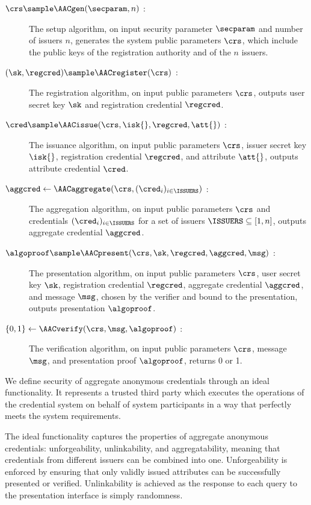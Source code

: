 \begin{description}

  \item[$\crs \sample \AACgen(\secparam, n)$ :] The setup algorithm, on input
security parameter $\secparam$ and number of issuers $n$, generates the system
public parameters $\crs$, which include the public keys of the registration
authority and of the $n$ issuers.

  \item[$(\sk,\regcred) \sample \AACregister(\crs)$ :] The registration
algorithm, on input public parameters $\crs$, outputs user secret key $\sk$ and
registration credential $\regcred$.

  \item[$\cred \sample \AACissue(\crs,\isk{},\regcred,\att{})$ :] The issuance
algorithm, on input public parameters $\crs$, issuer secret key $\isk{}$,
registration credential $\regcred$, and attribute $\att{}$, outputs attribute
credential $\cred$.

  \item[$\aggcred \leftarrow \AACaggregate(\crs,(\cred_i)_{i \in \ISSUERS})$ :]
The aggregation algorithm, on input public parameters $\crs$ and credentials
$(\cred_i)_{i \in \ISSUERS}$ for a set of issuers $\ISSUERS \subseteq [1,n]$,
outputs aggregate credential $\aggcred$.

  \item[$\algoproof \sample \AACpresent(\crs,\sk,\regcred,\aggcred,\msg)$ :]
The presentation algorithm, on input public parameters $\crs$, user secret key
$\sk$, registration credential $\regcred$, aggregate credential $\aggcred$, and
message $\msg$, chosen by the verifier and bound to the presentation, outputs
presentation $\algoproof$.

  \item[$\{0,1\} \leftarrow \AACverify(\crs,\msg,\algoproof)$ :] The
verification algorithm, on input public parameters $\crs$, message $\msg$, and
presentation proof $\algoproof$, returns 0 or 1.

\end{description}

We define security of aggregate anonymous credentials through an ideal
functionality. It represents a
trusted third party which executes the operations of the credential system on
behalf of system participants in a way that perfectly meets the system
requirements.

The ideal functionality captures the properties of aggregate anonymous
credentials: unforgeability, unlinkability, and aggregatability, meaning that
credentials from different issuers can be combined into one.  Unforgeability
is enforced by ensuring that only validly issued attributes can be successfully
presented or verified. Unlinkability is achieved as the response to each query
to the presentation interface is simply randomness.

